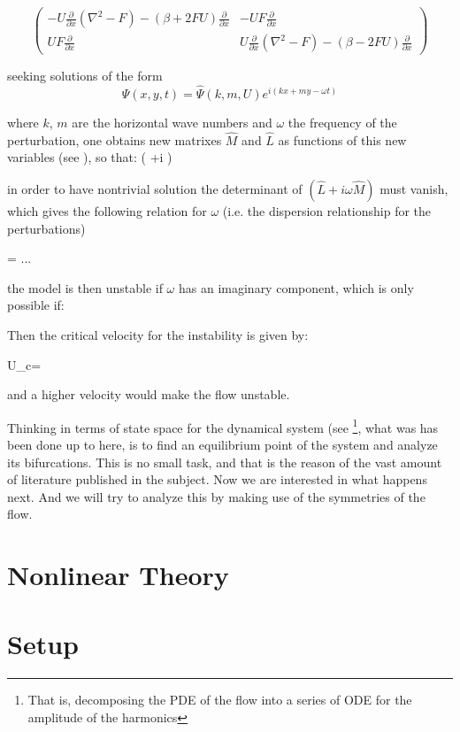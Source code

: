 \begin{equation}
\begin{pmatrix}
  -U \frac{\partial}{\partial x}(\nabla ^2-F)-(\beta+2FU)\frac{\partial}{\partial x}
   & -U F \frac{\partial}{\partial x} \\
   U F \frac{\partial}{\partial x}
   & U \frac{\partial}{\partial x}(\nabla ^2-F)-(\beta-2FU)\frac{\partial}{\partial x}
\end{pmatrix}
\label{Mmatrix2}
\end{equation}

seeking solutions of the form
\begin{equation}
\Psi (x,y,t)=\hat{\Psi} (k,m,U) e^{i(kx+my-\omega t)}
\label{PRT}
\end{equation}

where $k$, $m$ are the horizontal wave numbers and $\omega$ the frequency of the perturbation, one obtains new matrixes $\hat{M}$ and $\hat{L}$ as functions of this new variables (see ), so that: 
\beq
\left( +i \omega {}\right) 

in order to have nontrivial solution the determinant of $\left( \hat{L}+i \omega \hat{M}\right)$ must vanish, which gives the following relation for $\omega$ (i.e. the dispersion relationship for the perturbations)

\beq
\omega = ...%

the model is then unstable if $\omega$ has an imaginary component, which is only possible if:
\beq

Then the critical velocity for the instability is given by:

\beq
U_c=%

and a higher velocity would make the flow unstable.

Thinking in terms of state space for the dynamical system (see  \footnote{That is, decomposing the PDE of the flow into a series of ODE for the amplitude of the harmonics}, what was has been done up to here, is to find an equilibrium point of the system and analyze its bifurcations. This is no small task, and that is the reason of the vast amount of literature published in the subject.
Now we are interested in what happens next. And we will try to analyze this by making use of the symmetries of the flow.
\section{Nonlinear Theory}
\label{s:nonlinear}
\section{Setup}
\label{s:setup}
